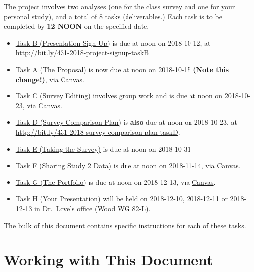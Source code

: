 \documentclass[]{book}
\providecommand{\tightlist}{%
  \setlength{\itemsep}{0pt}\setlength{\parskip}{0pt}}
\theoremstyle{definition}
\theoremstyle{definition}
\theoremstyle{definition}
\theoremstyle{remark}
\begin{document}
The project involves two analyses (one for the class survey and one for
your personal study), and a total of 8 tasks (deliverables.) Each task
is to be completed by \textbf{12 NOON} on the specified date.

\begin{itemize}
\tightlist
\item
  \protect\hyperlink{taskB}{Task B (Presentation Sign-Up)} is due at
  noon on 2018-10-12, at
  \url{http://bit.ly/431-2018-project-signup-taskB}
\item
  \protect\hyperlink{taskA}{Task A (The Proposal)} is now due at noon on
  2018-10-15 \textbf{(Note this change!)}, via
  \href{https://canvas.case.edu/}{Canvas}.
\item
  \protect\hyperlink{taskC}{Task C (Survey Editing)} involves group work
  and is due at noon on 2018-10-23, via
  \href{https://canvas.case.edu/}{Canvas}.
\item
  \protect\hyperlink{taskD}{Task D (Survey Comparison Plan)} is
  \textbf{also} due at noon on 2018-10-23, at
  \url{http://bit.ly/431-2018-survey-comparison-plan-taskD}.
\item
  \protect\hyperlink{taskE}{Task E (Taking the Survey)} is due at noon
  on 2018-10-31
\item
  \protect\hyperlink{taskF}{Task F (Sharing Study 2 Data)} is due at
  noon on 2018-11-14, via \href{https://canvas.case.edu/}{Canvas}.
\item
  \protect\hyperlink{taskG}{Task G (The Portfolio)} is due at noon on
  2018-12-13, via \href{https://canvas.case.edu/}{Canvas}.
\item
  \protect\hyperlink{taskH}{Task H (Your Presentation)} will be held on
  2018-12-10, 2018-12-11 or 2018-12-13 in Dr.~Love's office (Wood WG
  82-L).
\end{itemize}

The bulk of this document contains specific instructions for each of
these tasks.

\hypertarget{working-with-this-document}{%
\section*{Working with This Document}\label{working-with-this-document}}
\end{document}
